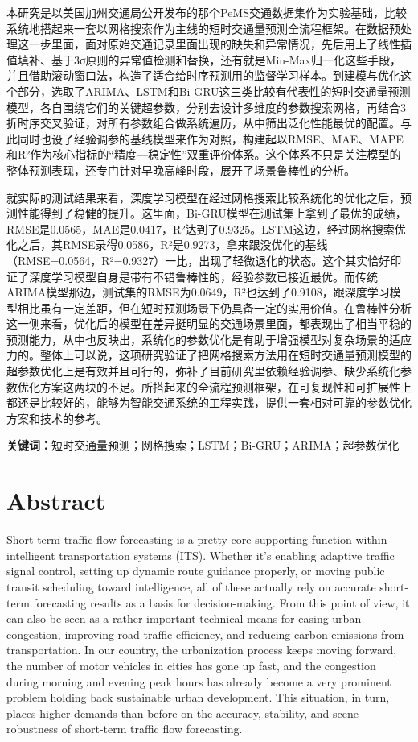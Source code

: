 \documentclass[12pt,a4paper,oneside]{ctexbook}
\begin{document}
	本研究是以美国加州交通局公开发布的那个PeMS交通数据集作为实验基础，比较系统地搭起来一套以网格搜索作为主线的短时交通量预测全流程框架。在数据预处理这一步里面，面对原始交通记录里面出现的缺失和异常情况，先后用上了线性插值填补、基于3σ原则的异常值检测和替换，还有就是Min-Max归一化这些手段，并且借助滚动窗口法，构造了适合给时序预测用的监督学习样本。到建模与优化这个部分，选取了ARIMA、LSTM和Bi-GRU这三类比较有代表性的短时交通量预测模型，各自围绕它们的关键超参数，分别去设计多维度的参数搜索网格，再结合3折时序交叉验证，对所有参数组合做系统遍历，从中筛出泛化性能最优的配置。与此同时也设了经验调参的基线模型来作为对照，构建起以RMSE、MAE、MAPE和R²作为核心指标的“精度—稳定性”双重评价体系。这个体系不只是关注模型的整体预测表现，还专门针对早晚高峰时段，展开了场景鲁棒性的分析。
	
	就实际的测试结果来看，深度学习模型在经过网格搜索比较系统化的优化之后，预测性能得到了稳健的提升。这里面，Bi-GRU模型在测试集上拿到了最优的成绩，RMSE是0.0565，MAE是0.0417，R²达到了0.9325。LSTM这边，经过网格搜索优化之后，其RMSE录得0.0586，R²是0.9273，拿来跟没优化的基线（RMSE=0.0564，R²=0.9327）一比，出现了轻微退化的状态。这个其实恰好印证了深度学习模型自身是带有不错鲁棒性的，经验参数已接近最优。而传统ARIMA模型那边，测试集的RMSE为0.0649，R²也达到了0.9108，跟深度学习模型相比虽有一定差距，但在短时预测场景下仍具备一定的实用价值。在鲁棒性分析这一侧来看，优化后的模型在差异挺明显的交通场景里面，都表现出了相当平稳的预测能力，从中也反映出，系统化的参数优化是有助于增强模型对复杂场景的适应力的。整体上可以说，这项研究验证了把网格搜索方法用在短时交通量预测模型的超参数优化上是有效并且可行的，弥补了目前研究里依赖经验调参、缺少系统化参数优化方案这两块的不足。所搭起来的全流程预测框架，在可复现性和可扩展性上都还是比较好的，能够为智能交通系统的工程实践，提供一套相对可靠的参数优化方案和技术的参考。
	
	\noindent\textbf{关键词：}短时交通量预测；网格搜索；LSTM；Bi-GRU；ARIMA；超参数优化
	
	\chapter*{Abstract}
	
	Short-term traffic flow forecasting is a pretty core supporting function within intelligent transportation systems (ITS). Whether it's enabling adaptive traffic signal control, setting up dynamic route guidance properly, or moving public transit scheduling toward intelligence, all of these actually rely on accurate short-term forecasting results as a basis for decision-making. From this point of view, it can also be seen as a rather important technical means for easing urban congestion, improving road traffic efficiency, and reducing carbon emissions from transportation. In our country, the urbanization process keeps moving forward, the number of motor vehicles in cities has gone up fast, and the congestion during morning and evening peak hours has already become a very prominent problem holding back sustainable urban development. This situation, in turn, places higher demands than before on the accuracy, stability, and scene robustness of short-term traffic flow forecasting.
	
\end{document}
